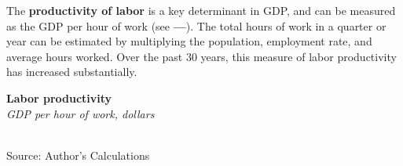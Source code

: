 \documentclass{report}
\makeatletter
\newcommand{\tbllink}[1]{\href{https://raw.githubusercontent.com/bdecon/US-chartbook/master/chartbook/data/#1}{\faTable}}
\newcommand*\short[1]{\expandafter\@gobbletwo\number\numexpr#1\relax}
\newcommand{\shdateaxisticks}{
		date coordinates in=x, axis line style={draw=none},
		xmax={2022-10-31},
		max space between ticks=40,	    
		xtick={{1990-01-01}, {1995-01-01}, {2000-01-01}, 
			{2005-01-01}, {2010-01-01}, {2015-01-01}, {2020-01-01}},
		minor xtick={},
		enlarge y limits={0.06}, enlarge x limits={0.01},
		}
\newcommand{\thickline}[4]{\addplot[ultra thick, no markers, color=#1] 
		table [x=#2, y=#3, col sep=comma] {#4};	}
\newcommand{\rbars}{
		\fill[color=black!10] (axis cs:{1990-07-01},\pgfkeysvalueof{/pgfplots/ymin}) rectangle 
			(axis cs:{1991-03-01}, \pgfkeysvalueof{/pgfplots/ymax});
		\fill[color=black!10] (axis cs:{2007-12-01},\pgfkeysvalueof{/pgfplots/ymin}) rectangle 
			(axis cs:{2009-07-01}, \pgfkeysvalueof{/pgfplots/ymax});
		\fill[color=black!10] (axis cs:{2001-03-01},\pgfkeysvalueof{/pgfplots/ymin}) rectangle 
			(axis cs:{2001-11-01}, \pgfkeysvalueof{/pgfplots/ymax});
		\fill[color=black!10] (axis cs:{2020-02-01},\pgfkeysvalueof{/pgfplots/ymin}) rectangle 
			(axis cs:{2020-05-01}, \pgfkeysvalueof{/pgfplots/ymax});}
\makeatother
\begin{document}
\vspace{3mm}

\begin{minipage}{0.76\textwidth}
\small The \textbf{productivity of labor} is a key determinant in GDP, and can be measured as the GDP per hour of work (see {\color{cyan!60!white}\textbf{---}}). The total hours of work in a quarter or year can be estimated by multiplying the population, employment rate, and average hours worked. Over the past 30 years, this measure of labor productivity has increased substantially. 
\end{minipage}

\begin{minipage}{0.3\textwidth}
\small 
\end{minipage}\hspace{8mm}
\begin{minipage}{0.405\textwidth}
\normalsize \textbf{Labor productivity}\\
\footnotesize{\textit{GDP per hour of work, dollars}}\\
\hspace*{-2mm} \\
\footnotesize{Source: Author's Calculations} \hfill \tbllink{gdpjobslvl.csv} 
\end{minipage}
\newpage
\hypertarget{oegr}{}
\end{document}
